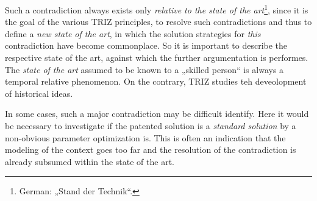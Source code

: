 \documentclass[11pt,a4paper]{article}
\begin{document}
Such a contradiction always exists only \emph{relative to the state of the
  art}\footnote{German: „Stand der Technik“.}, since it is the goal of the
various TRIZ principles, to resolve such contradictions and thus to define a
\emph{new state of the art}, in which the solution strategies for \emph{this}
contradiction have become commonplace. So it is important to describe the
respective state of the art, against which the further argumentation is
performes. The \emph{state of the art} assumed to be known to a „skilled
person“ is always a temporal relative phenomenon. On the contrary, TRIZ
studies teh deveolopment of historical ideas.

In some cases, such a major contradiction may be difficult identify. Here it
would be necessary to investigate if the patented solution is a \emph{standard
  solution} by a non-obvious parameter optimization is. This is often an
indication that the modeling of the context goes too far and the resolution of
the contradiction is already subsumed within the state of the art.
\end{document}
